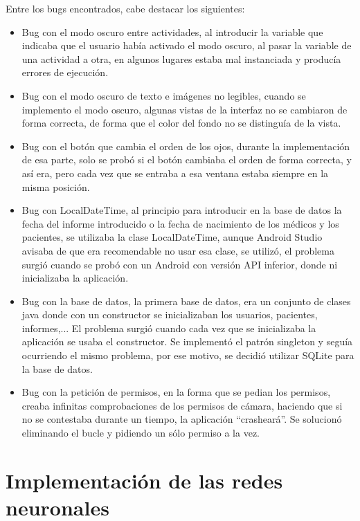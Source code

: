 Entre los bugs encontrados, cabe destacar los siguientes:
\begin{itemize}
    \item Bug con el modo oscuro entre actividades, al introducir la variable que indicaba que el usuario había activado el modo oscuro, al pasar la variable de una actividad a otra, en algunos lugares estaba mal instanciada y producía errores de ejecución.
    \item Bug con el modo oscuro de texto e imágenes no legibles, cuando se implemento el modo oscuro, algunas vistas de la interfaz no se cambiaron de forma correcta, de forma que el color del fondo no se distinguía de la vista.
    \item Bug con el botón que cambia el orden de los ojos, durante la implementación de esa parte, solo se probó si el botón cambiaba el orden de forma correcta, y así era, pero cada vez que se entraba a esa ventana estaba siempre en la misma posición. 

    \item Bug con LocalDateTime, al principio para introducir en la base de datos la fecha del informe introducido o la fecha de nacimiento de los médicos y los pacientes, se utilizaba la clase LocalDateTime, aunque Android Studio avisaba de que era recomendable no usar esa clase, se utilizó, el problema surgió cuando se probó con un Android con versión API inferior, donde ni inicializaba la aplicación.

    \item Bug con la base de datos, la primera base de datos, era un conjunto de clases java donde con un constructor se inicializaban los usuarios, pacientes, informes,... El problema surgió cuando cada vez que se inicializaba la aplicación se usaba el constructor. Se implementó el patrón singleton y seguía ocurriendo el mismo problema, por ese motivo, se decidió utilizar SQLite para la base de datos.

    \item Bug con la petición de permisos, en la forma que se pedian los permisos, creaba infinitas comprobaciones de los permisos de cámara, haciendo que si no se contestaba durante un tiempo, la aplicación ``crasheará''. Se solucionó eliminando el bucle y pidiendo un sólo permiso a la vez. 
\end{itemize}

\section{Implementación de las redes neuronales}

